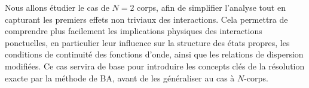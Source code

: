 {\medskip

Nous allons étudier le cas de $N=2$ corps, afin de simplifier l’analyse tout en capturant les premiers effets non triviaux des interactions. Cela permettra de comprendre plus facilement les implications physiques des interactions ponctuelles, en particulier leur influence sur la structure des états propres, les conditions de continuité des fonctions d’onde, ainsi que les relations de dispersion modifiées. Ce cas servira de base pour introduire les concepts clés de la résolution exacte par la méthode de \acrfull{BA}, avant de les généraliser au cas à $N$-corps.}

 




%
%
%
